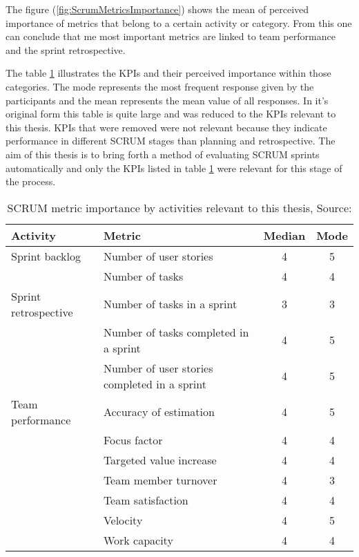 \noindent The figure (\ref{fig:ScrumMetricsImportance}) shows the mean of perceived importance 
of metrics that belong to a certain activity or category. 
From this one can conclude that me most important metrics are linked to 
team performance and the sprint retrospective.

\noindent The table \ref{tab:ScrumMetricsImportanceTable} illustrates the KPIs and their 
perceived importance within those categories. 
The mode represents the most frequent response given by the 
participants and the mean represents the mean value of all responses. In it's original form 
this table is quite large and was reduced to the KPIs relevant to this thesis. KPIs that were removed
were not relevant because they indicate performance in different SCRUM stages than planning and retrospective.
The aim of this thesis is to bring forth a method of evaluating SCRUM sprints automatically and only the KPIs listed 
in table \ref{tab:ScrumMetricsImportanceTable} were relevant for this stage of the process.


\begin{table}[]
    \centering
    \begin{tabular}{l l c c}
        \hline
        \textbf{Activity} & \textbf{Metric} & \textbf{Median} & \textbf{Mode} \\
        \hline
        Sprint backlog & Number of user stories & 4 & 5 \\
        & Number of tasks & 4 & 4 \\
        Sprint retrospective & Number of tasks in a sprint & 3 & 3 \\
        & Number of tasks completed in a sprint & 4 & 5 \\
        & Number of user stories completed in a sprint & 4 & 5 \\
        Team performance & Accuracy of estimation & 4 & 5 \\
        & Focus factor & 4 & 4 \\
        & Targeted value increase & 4 & 4 \\
        & Team member turnover & 4 & 3 \\
        & Team satisfaction & 4 & 4 \\
        & Velocity & 4 & 5 \\
        & Work capacity & 4 & 4 \\
    \end{tabular}
    \decoRule
    \caption[SCRUM metrics]{SCRUM metric importance by activities relevant to this thesis, Source: \cite{PercPerfOfMetrForAgileScrumEnv}}
    \label{tab:ScrumMetricsImportanceTable}
\end{table}

